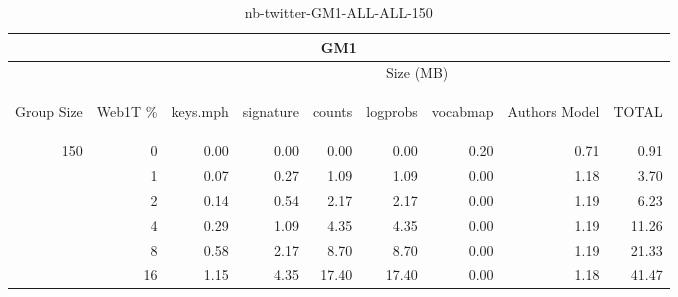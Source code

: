 \begin{center}
\begin{table}[htbp]
\begin{tabular}{ | r | r | r | r | r | r | r | r | r |}
\hline
\multicolumn{9}{|c|}{GM1}\\
\hline
 & & \multicolumn{7}{|c|}{Size (MB)}\\ \cline{3-9}
\begin{sideways}Group Size\end{sideways} & \begin{sideways}Web1T \% \end{sideways} & \begin{sideways}keys.mph\end{sideways} & \begin{sideways}signature\end{sideways} & \begin{sideways}counts\end{sideways} & \begin{sideways}logprobs\end{sideways} & \begin{sideways}vocabmap\end{sideways} & \begin{sideways}Authors Model \end{sideways} & \begin{sideways}TOTAL\end{sideways}\\
\hline
\multirow{5}{*}{150}
 & 0 & 0.00 & 0.00 & 0.00 & 0.00 & 0.20 & 0.71 & 0.91\\ \cline{2-9}
 & 1 & 0.07 & 0.27 & 1.09 & 1.09 & 0.00 & 1.18 & 3.70\\ \cline{2-9}
 & 2 & 0.14 & 0.54 & 2.17 & 2.17 & 0.00 & 1.19 & 6.23\\ \cline{2-9}
 & 4 & 0.29 & 1.09 & 4.35 & 4.35 & 0.00 & 1.19 & 11.26\\ \cline{2-9}
 & 8 & 0.58 & 2.17 & 8.70 & 8.70 & 0.00 & 1.19 & 21.33\\ \cline{2-9}
 & 16 & 1.15 & 4.35 & 17.40 & 17.40 & 0.00 & 1.18 & 41.47\\ \cline{2-9}
\hline
\end{tabular}
\caption{nb-twitter-GM1-ALL-ALL-150}
\label{table:nb-twitter-GM1-ALL-ALL-150}
\end{table}
\end{center}

